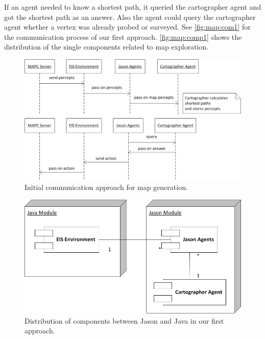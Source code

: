 If an agent needed to know a shortest path, it queried the cartographer agent and got the shortest path as an answer. Also the agent could query the cartographer agent whether a vertex was already probed or surveyed. See \autoref{fig:map:com1} for the communication process of our first approach. \autoref{fig:map:comp1} shows the distribution of the single components related to map exploration.
\begin{figure}
  \centering
  \includegraphics[width=\linewidth]{images/map_com_1.png}
  \caption{Initial communication approach for map generation.}
  \label{fig:map:com1}
\end{figure}

\begin{figure}
  \centering
  \includegraphics[width=\linewidth]{images/map_comp_1.png}
  \caption{Distribution of components between Jason and Java in our first approach.}
  \label{fig:map:comp1}
\end{figure}

